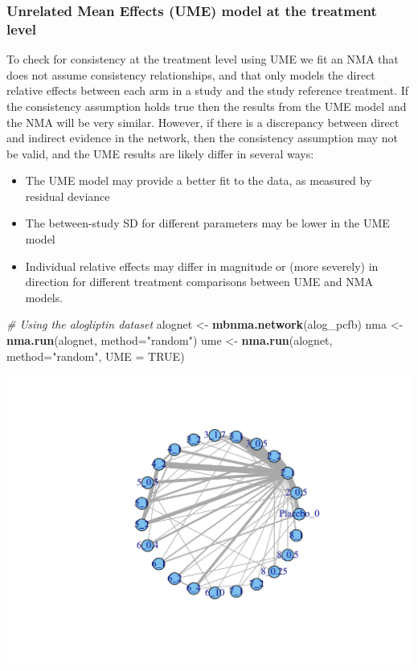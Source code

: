 \documentclass[]{article}
\newenvironment{Shaded}{\begin{snugshade}}{\end{snugshade}}
\newcommand{\CommentTok}[1]{\textcolor[rgb]{0.56,0.35,0.01}{\textit{#1}}}
\newcommand{\DataTypeTok}[1]{\textcolor[rgb]{0.13,0.29,0.53}{#1}}
\newcommand{\KeywordTok}[1]{\textcolor[rgb]{0.13,0.29,0.53}{\textbf{#1}}}
\newcommand{\NormalTok}[1]{#1}
\newcommand{\OtherTok}[1]{\textcolor[rgb]{0.56,0.35,0.01}{#1}}
\newcommand{\StringTok}[1]{\textcolor[rgb]{0.31,0.60,0.02}{#1}}
\providecommand{\tightlist}{%
  \setlength{\itemsep}{0pt}\setlength{\parskip}{0pt}}
\begin{document}
\hypertarget{unrelated-mean-effects-ume-model-at-the-treatment-level}{%
\subsubsection{Unrelated Mean Effects (UME) model at the treatment
level}\label{unrelated-mean-effects-ume-model-at-the-treatment-level}}

To check for consistency at the treatment level using UME we fit an NMA
that does not assume consistency relationships, and that only models the
direct relative effects between each arm in a study and the study
reference treatment. If the consistency assumption holds true then the
results from the UME model and the NMA will be very similar. However, if
there is a discrepancy between direct and indirect evidence in the
network, then the consistency assumption may not be valid, and the UME
results are likely differ in several ways:

\begin{itemize}
\tightlist
\item
  The UME model may provide a better fit to the data, as measured by
  residual deviance
\item
  The between-study SD for different parameters may be lower in the UME
  model
\item
  Individual relative effects may differ in magnitude or (more severely)
  in direction for different treatment comparisons between UME and NMA
  models.
\end{itemize}

\begin{Shaded}
\begin{Highlighting}[]
\CommentTok{# Using the alogliptin dataset}
\NormalTok{alognet <-}\StringTok{ }\KeywordTok{mbnma.network}\NormalTok{(alog_pcfb)}
\NormalTok{nma <-}\StringTok{ }\KeywordTok{nma.run}\NormalTok{(alognet, }\DataTypeTok{method=}\StringTok{"random"}\NormalTok{)}
\NormalTok{ume <-}\StringTok{ }\KeywordTok{nma.run}\NormalTok{(alognet, }\DataTypeTok{method=}\StringTok{"random"}\NormalTok{, }\DataTypeTok{UME =} \OtherTok{TRUE}\NormalTok{)}
\end{Highlighting}
\end{Shaded}

\includegraphics{mbnmadose_files/figure-latex/unnamed-chunk-49-1.pdf}
\end{document}
